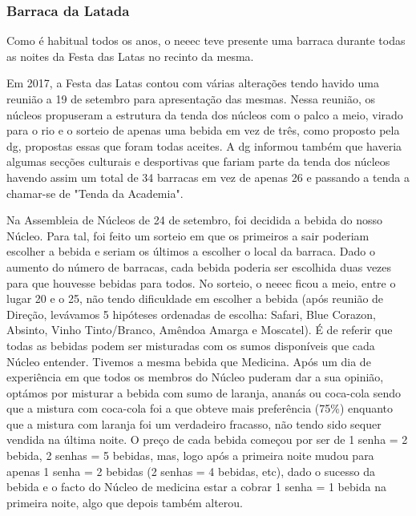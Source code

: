
\subsubsection{Barraca da Latada}

Como é habitual todos os anos, o \acrshort{neeec} teve presente uma barraca durante todas as noites da Festa das Latas no recinto da mesma.

Em 2017, a Festa das Latas contou com várias alterações tendo havido uma reunião a 19 de setembro para apresentação das mesmas. Nessa reunião, os núcleos propuseram a estrutura da tenda dos núcleos com o palco a meio, virado para o rio e o sorteio de apenas uma bebida em vez de três, como proposto pela \acrshort{dg}, propostas essas que foram todas aceites. A \acrshort{dg} informou também que haveria algumas secções culturais e desportivas que fariam parte da tenda dos núcleos havendo assim um total de 34 barracas em vez de apenas 26 e passando a tenda a chamar-se de "Tenda da Academia".

Na Assembleia de Núcleos de 24 de setembro, foi decidida a bebida do nosso Núcleo. Para tal, foi feito um sorteio em que os primeiros a sair poderiam escolher a bebida e seriam os últimos a escolher o local da barraca. Dado o aumento do número de barracas, cada bebida poderia ser escolhida duas vezes para que houvesse bebidas para todos. No sorteio, o \acrshort{neeec} ficou a meio, entre o lugar 20 e o 25, não tendo dificuldade em escolher a bebida (após reunião de Direção, levávamos 5 hipóteses ordenadas de escolha: Safari, Blue Corazon, Absinto, Vinho Tinto/Branco, Amêndoa Amarga e Moscatel). É de referir que todas as bebidas podem ser misturadas com os sumos disponíveis que cada Núcleo entender. Tivemos a mesma bebida que Medicina. Após um dia de experiência em que todos os membros do Núcleo puderam dar a sua opinião, optámos por misturar a bebida com sumo de laranja, ananás ou coca-cola sendo que a mistura com coca-cola foi a que obteve mais preferência (75\%) enquanto que a mistura com laranja foi um verdadeiro fracasso, não tendo sido sequer vendida na última noite. O preço de cada bebida começou por ser de 1 senha = 2 bebida, 2 senhas = 5 bebidas, mas, logo após a primeira noite mudou para apenas 1 senha = 2 bebidas (2 senhas = 4 bebidas, etc), dado o sucesso da bebida e o facto do Núcleo de medicina estar a cobrar 1 senha = 1 bebida na primeira noite, algo que depois também alterou.

